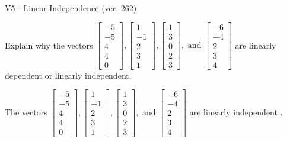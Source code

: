 \begin{exercise}
  \begin{exerciseTitle}V5 - Linear Independence (ver. 262)\end{exerciseTitle}
  \begin{exerciseStatement}
    Explain why the vectors \(\left[\begin{array}{r}
-5 \\
-5 \\
4 \\
4 \\
0
\end{array}\right] , \left[\begin{array}{r}
1 \\
-1 \\
2 \\
3 \\
1
\end{array}\right] , \left[\begin{array}{r}
1 \\
3 \\
0 \\
2 \\
3
\end{array}\right] , \text{ and } \left[\begin{array}{r}
-6 \\
-4 \\
2 \\
3 \\
4
\end{array}\right]\) are linearly dependent or linearly independent.	


  \end{exerciseStatement}
  \begin{exerciseAnswer}
   The vectors \(\left[\begin{array}{r}
-5 \\
-5 \\
4 \\
4 \\
0
\end{array}\right] , \left[\begin{array}{r}
1 \\
-1 \\
2 \\
3 \\
1
\end{array}\right] , \left[\begin{array}{r}
1 \\
3 \\
0 \\
2 \\
3
\end{array}\right] , \text{ and } \left[\begin{array}{r}
-6 \\
-4 \\
2 \\
3 \\
4
\end{array}\right]\) are 
  	 linearly independent  .
  


  \end{exerciseAnswer}
\end{exercise}